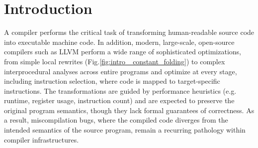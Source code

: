 \documentclass[review, anonymous, acmsmall, screen]{acmart}
\begin{document}
\maketitle

\section{Introduction}
A compiler performs the critical task of transforming human-readable source code into executable 
machine code. In addition, modern, large-scale, open-source compilers such as LLVM \cite{llvm_ref} 
perform a wide range of sophisticated optimizations, from simple local rewrites (Fig.\ref{fig:intro_
constant_folding}) to complex interprocedural analyses across entire programs and optimize at every 
stage, including instruction selection, where code is mapped to target-specific instructions. The 
transformations are guided by performance heuristics (e.g. runtime, register usage, instruction count) 
 and are expected to preserve the original program semantics, though they lack formal guarantees of correctness.
As a result, miscompilation bugs, where the compiled code diverges from  the intended semantics of 
the source program, remain a recurring pathology within compiler infrastructures.
\end{document}
